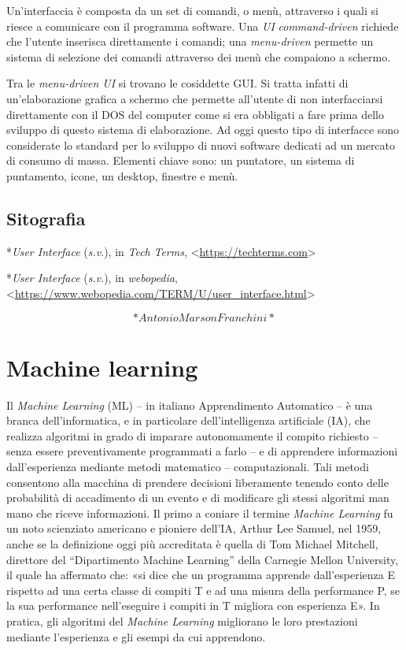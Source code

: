 \documentclass[
  b5paper,
  twoside,
  11pt,
  chapterprefix=false,
  bibliography=totocnumbered,
  listof=flat]{scrbook}
\begin{document}
Un'interfaccia è composta da un set di comandi, o menù, attraverso i
quali si riesce a comunicare con il programma software. Una \emph{UI}
\emph{command-driven} richiede che l'utente inserisca direttamente i comandi;
una \emph{menu-driven} permette un sistema di selezione dei comandi
attraverso dei menù che compaiono a schermo.

Tra le \emph{menu-driven UI} si trovano le cosiddette GUI. Si tratta infatti
di un'elaborazione grafica a schermo che permette all'utente di non
interfacciarsi direttamente con il DOS del computer come si era
obbligati a fare prima dello sviluppo di questo sistema di elaborazione.
Ad oggi questo tipo di interfacce sono considerate lo standard per lo
sviluppo di nuovi software dedicati ad un mercato di consumo di massa.
Elementi chiave sono: un puntatore, un sistema di puntamento, icone, un
desktop, finestre e menù.

\hypertarget{sitografia-17}{%
\section*{Sitografia}\label{sitografia-17}}

*\emph{User Interface} (\emph{s.v}.), in \emph{Tech} \emph{Terms},
\textless{}{\href{https://techterms.com/}{https://techterms.com}\textgreater{}}

*\emph{User Interface} (\emph{s.v}.), in \emph{webopedia},
\textless{}\href{https://www.webopedia.com/TERM/U/user_interface.html}{{https://www.webopedia.com/TERM/U/user\_interface.html}}\textgreater{}

\[*Antonio Marson Franchini*\]

\hypertarget{machine-learning}{%
\chapter{Machine learning}\label{machine-learning}}

Il \emph{Machine Learning} (ML) -- in italiano Apprendimento Automatico -- è
una branca dell'informatica, e in particolare dell'intelligenza
artificiale (IA), che realizza algoritmi in grado di imparare
autonomamente il compito richiesto -- senza essere preventivamente
programmati a farlo -- e di apprendere informazioni dall'esperienza
mediante metodi matematico -- computazionali. Tali metodi consentono
alla macchina di prendere decisioni liberamente tenendo conto delle
probabilità di accadimento di un evento e di modificare gli stessi
algoritmi man mano che riceve informazioni. Il primo a coniare il
termine \emph{Machine Learning} fu un noto scienziato americano e pioniere
dell'IA, Arthur Lee Samuel, nel 1959, anche se la definizione oggi più
accreditata è quella di Tom Michael Mitchell, direttore del
\enquote{Dipartimento Machine Learning} della Carnegie Mellon University, il
quale ha affermato che: «si dice che un programma apprende
dall'esperienza E rispetto ad una certa classe di compiti T e ad una
misura della performance P, se la sua performance nell'eseguire i
compiti in T migliora con esperienza E». In pratica, gli algoritmi del
\emph{Machine Learning} migliorano le loro prestazioni mediante l'esperienza
e gli esempi da cui apprendono.~
\end{document}
